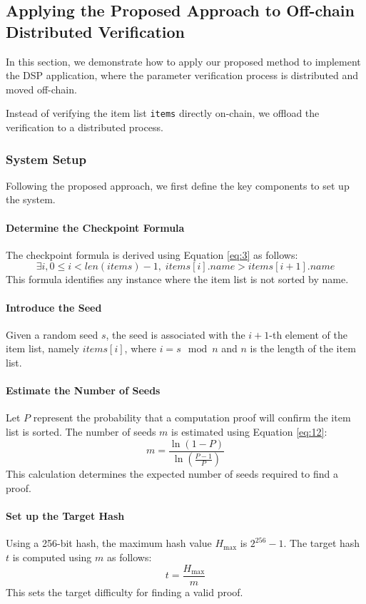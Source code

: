 \documentclass[runningheads]{llncs}
\begin{document}
\subsection{Applying the Proposed Approach to Off-chain Distributed Verification}
In this section, we demonstrate how to apply our proposed method to implement the DSP application, where the parameter verification process is distributed and moved off-chain.

Instead of verifying the item list \texttt{items} directly on-chain, we offload the verification to a distributed process.

\subsubsection{System Setup}
Following the proposed approach, we first define the key components to set up the system.

\paragraph{Determine the Checkpoint Formula}
The checkpoint formula is derived using Equation \ref{eq:3} as follows:
\[
\exists i, 0 \leq i < len(items) - 1, \; items[i].name > items[i+1].name
\]
This formula identifies any instance where the item list is not sorted by name.

\paragraph{Introduce the Seed}
Given a random seed \( s \), the seed is associated with the \( i+1 \)-th element of the item list, namely \( items[i] \), where \( i = s \mod n \) and \( n \) is the length of the item list.

\paragraph{Estimate the Number of Seeds}
Let \( P \) represent the probability that a computation proof will confirm the item list is sorted. The number of seeds \( m \) is estimated using Equation \ref{eq:12}:
\[
m = \frac{\ln(1 - P)}{\ln\left( \frac{P-1}{P} \right)}
\]
This calculation determines the expected number of seeds required to find a proof.

\paragraph{Set up the Target Hash}
Using a 256-bit hash, the maximum hash value \( H_{\text{max}} \) is \( 2^{256} - 1 \). The target hash \( t \) is computed using \( m \) as follows:
\[
t = \frac{H_{\text{max}}}{m}
\]
This sets the target difficulty for finding a valid proof.
\end{document}
